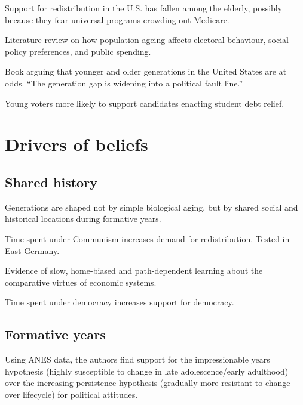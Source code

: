 \documentclass{article}
\newcommand{\citem}[1]{\medskip \noindent \textbf{\cite*{#1}}}
\begin{document}
\citem{ashok2015support}

Support for redistribution in the U.S. has fallen among the elderly, possibly because they fear universal programs crowding out Medicare.

\citem{vlandas2021ageing}

Literature review on how population ageing affects electoral behaviour, social policy preferences, and public spending.

\citem{munger2022generation}

Book arguing that younger and older generations in the United States are at odds. ``The generation gap is widening into a political fault line.''

\citem{sorelle2023political}

Young voters more likely to support candidates enacting student debt relief.





\section{Drivers of beliefs}

\subsection{Shared history}

\citem{mannheim1952sociological}

Generations are shaped not by simple biological aging, but by shared social and historical locations during formative years.

\citem{alesina2007good}

Time spent under Communism increases demand for redistribution. Tested in East Germany.

\citem{landier2008investigating}

Evidence of slow, home-biased and path-dependent learning about the comparative virtues of economic systems.

\citem{fuchs2015endogeneity}

Time spent under democracy increases support for democracy.

\subsection{Formative years}

\citem{krosnick1989aging}

Using ANES data, the authors find support for the impressionable years hypothesis (highly susceptible to change in late adolescence/early adulthood) over the increasing persistence hypothesis (gradually more resistant to change over lifecycle) for political attitudes.
\end{document}
